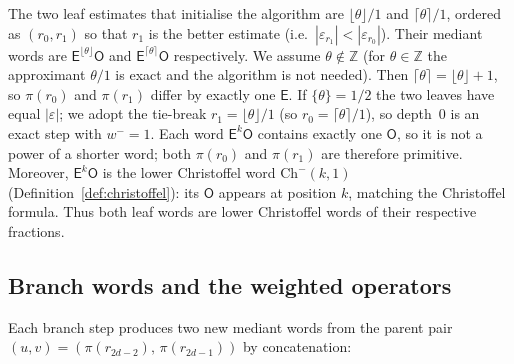 \documentclass[12pt]{article}
\theoremstyle{definition}
\theoremstyle{remark}
\theoremstyle{plain}
\newcommand{\eps}{\varepsilon}
\newcommand{\OO}{\mathsf{O}}
\newcommand{\EE}{\mathsf{E}}
\newcommand{\wminus}{w^{-}}
\begin{document}
The two leaf estimates that initialise the algorithm are $\lfloor\theta\rfloor/1$
and $\lceil\theta\rceil/1$, ordered as $(r_0, r_1)$ so that $r_1$ is the better estimate
(i.e.\ $|\eps_{r_1}| < |\eps_{r_0}|$).
Their mediant words are $\EE^{\lfloor\theta\rfloor}\OO$ and $\EE^{\lceil\theta\rceil}\OO$
respectively.
We assume $\theta \notin \mathbb{Z}$ (for $\theta \in \mathbb{Z}$ the approximant
$\theta/1$ is exact and the algorithm is not needed).
Then $\lceil\theta\rceil = \lfloor\theta\rfloor + 1$, so $\pi(r_0)$ and $\pi(r_1)$
differ by exactly one $\EE$.
If $\{\theta\} = 1/2$ the two leaves have equal $|\eps|$; we adopt the tie-break
$r_1 = \lfloor\theta\rfloor/1$ (so $r_0 = \lceil\theta\rceil/1$),
so depth~$0$ is an exact step with $\wminus = 1$.
Each word $\EE^k\OO$ contains exactly one $\OO$, so it is not a power of a shorter
word; both $\pi(r_0)$ and $\pi(r_1)$ are therefore primitive.
Moreover, $\EE^k\OO$ is the lower Christoffel word $\mathrm{Ch}^-(k, 1)$
(Definition~\ref{def:christoffel}): its $\OO$ appears at position $k$, matching
the Christoffel formula.
Thus both leaf words are lower Christoffel words of their respective fractions.

\subsection{Branch words and the weighted operators}
\label{sec:parity-branch}

Each branch step produces two new mediant words from the parent pair
$(u, v) = (\pi(r_{2d-2}),\allowbreak\, \pi(r_{2d-1}))$ by concatenation:
\end{document}
